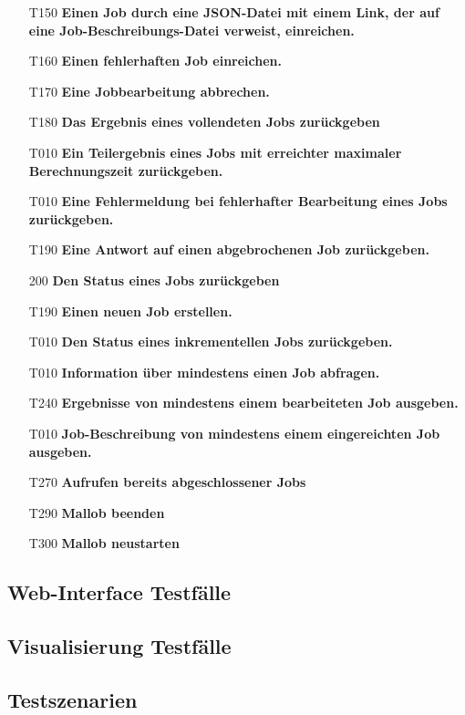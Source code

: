 \begin{itemize}
    \item[T150] \textbf{Einen Job durch eine JSON-Datei mit einem Link, der auf eine Job-Beschreibungs-Datei verweist, einreichen.}
    
    \item[T160] \textbf{Einen fehlerhaften Job einreichen.}
    
    \item[T170] \textbf{Eine Jobbearbeitung abbrechen.}
    
    \item[T180] \textbf{Das Ergebnis eines vollendeten Jobs zurückgeben}
    
    \item[T010] \textbf{Ein Teilergebnis eines Jobs mit erreichter maximaler Berechnungszeit zurückgeben.}
    
    \item[T010] \textbf{Eine Fehlermeldung bei fehlerhafter Bearbeitung eines Jobs zurückgeben.}
    
    \item[T190] \textbf{Eine Antwort auf einen abgebrochenen Job zurückgeben.}
    
    \item[200] \textbf{Den Status eines Jobs zurückgeben}
    
    \item[T190] \textbf{Einen neuen Job erstellen.}
    
    \item[T010] \textbf{Den Status eines inkrementellen Jobs zurückgeben.}
    
    \item[T010] \textbf{Information über mindestens einen Job abfragen.}
    
    \item[T240] \textbf{Ergebnisse von mindestens einem bearbeiteten Job ausgeben.}
    
    \item[T010] \textbf{Job-Beschreibung von mindestens einem eingereichten Job ausgeben.}
    
    \item[T270] \textbf{Aufrufen bereits abgeschlossener Jobs}
    
    \item[T290] \textbf{Mallob beenden}
    
    \item[T300] \textbf{Mallob neustarten}
\end{itemize}

\subsection{Web-Interface Testfälle}

\subsection{Visualisierung Testfälle}


\subsection{Testszenarien}
	